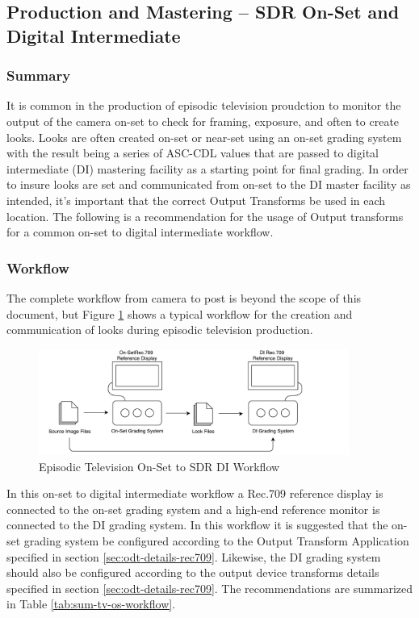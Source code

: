 \subsection{Production and Mastering -- SDR On-Set and Digital Intermediate} \label{subsec:tv-onset-di-sdr}

\subsubsection{Summary}
It is common in the production of episodic television proudction to monitor the output of the camera on-set to check for framing, exposure, and often to create looks.  Looks are often created on-set or near-set using an on-set grading system with the result being a series of ASC-CDL values that are passed to digital intermediate (DI) mastering facility as a starting point for final grading.  In order to insure looks are set and communicated from on-set to the DI master facility as intended, it's important that the correct Output Transforms be used in each location.  The following is a recommendation for the usage of Output transforms for a common on-set to digital intermediate workflow.

\subsubsection{Workflow}
The complete workflow from camera to post is beyond the scope of this document, but Figure \ref{fig:workflow_tv-sdr-on-set-di} shows a typical workflow for the creation and communication of looks during episodic television production.

\begin{figure}[ht!]
\centering
    \includegraphics[width=4in]{images/workflows/workflow_tv-sdr-on-set-di.pdf}
    \caption{\small Episodic Television On-Set to SDR DI Workflow}
    \label{fig:workflow_tv-sdr-on-set-di}
\end{figure}

In this on-set to digital intermediate workflow a Rec.709 reference display is connected to the on-set grading system and a high-end reference monitor is connected to the DI grading system.  In this workflow it is suggested that the on-set grading system be configured according to the Output Transform Application specified in section \ref{sec:odt-details-rec709}.  Likewise, the DI grading system should also be configured according to the output device transforms details specified in section \ref{sec:odt-details-rec709}.  The recommendations are summarized in Table \ref{tab:sum-tv-os-workflow}.

